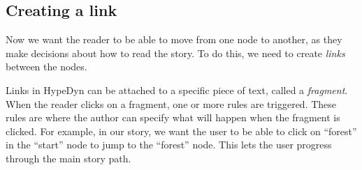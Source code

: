 \documentclass{article}
\begin{document}
\subsection{Creating a link}

Now we want the reader to be able to move from one node to another, as they make decisions about how to read the story. To do this, we need to create \textit{links} between the nodes.

Links in HypeDyn can be attached to a specific piece of text, called a \textit{fragment}. When the reader clicks on a fragment, one or more rules are triggered. These rules are where the author can specify what will happen when the fragment is clicked. For example, in our
story, we want the user to be able to click on ``forest'' in the ``start'' node to jump to the ``forest'' node. This lets the user progress through the main story path. 
\end{document}
